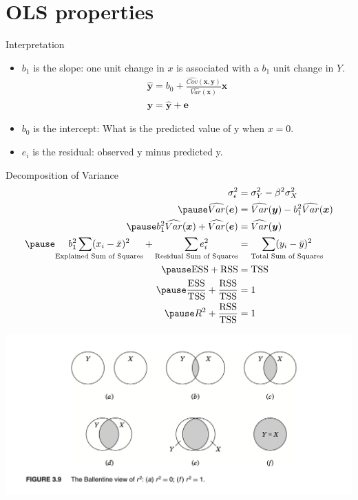 \documentclass[aspectratio=169, handout]{beamer}
\numberwithin{equation}{section}
\begin{document}
\section{OLS properties}

\begin{frame}{Interpretation}
\begin{itemize}
\item $b_1$ is the slope: one unit change in $x$ is associated with a $b_1$ unit change in $Y$.\pause
\begin{eqnarray*}
\bm{\hat{y}}=b_0+\frac{\widehat{Cov}(\bm{x},\bm{y})}{\widehat{Var}(\bm{x})}\bm{x}\\
\bm{y}=\bm{\hat{y}}+\bm{e}
\end{eqnarray*}\pause
\item $b_0$ is the intercept: What is the predicted value of y when $x=0$.\pause
\item $e_i$ is the residual: observed y minus predicted y.
\end{itemize}
\end{frame}

\begin{frame}{Decomposition of Variance}
\begin{align*}
\sigma^2_\epsilon &= \sigma^2_Y-\beta^2 \sigma^2_X\\\pause
\widehat{Var}(\bm{e}) &= \widehat{Var}(\bm{y})-b_1^2 \widehat{Var}(\bm{x})\\\pause
b_1^2 \widehat{Var}(\bm{x})+\widehat{Var}(\bm{e})&= \widehat{Var}(\bm{y})\\\pause
\underset{\text{Explained Sum of Squares}}{b_1^2 \sum (x_i-\bar{x})^2}+\underset{\text{Residual Sum of Squares}}{\sum e_i^2}&=\underset{\text{Total Sum of Squares}}{\sum(y_i-\bar{y})^2}\\\pause
\text{ESS}+\text{RSS}&=\text{TSS}\\\pause
\frac{\text{ESS}}{\text{TSS}}+\frac{\text{RSS}}{\text{TSS}}&=1\\\pause
R^2+\frac{\text{RSS}}{\text{TSS}}&=1
\end{align*}
\end{frame}

\begin{frame}
\includegraphics[width=5 in]{Images/Ballentine.png}
\end{frame}
\end{document}
